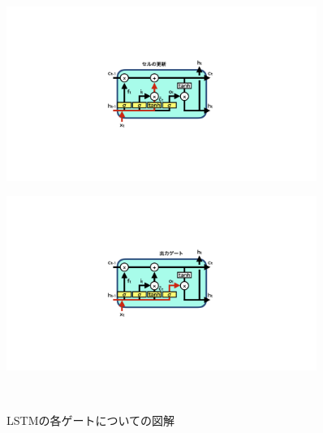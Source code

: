 \begin{figure}[htbp]
  \begin{minipage}{1.0\textwidth}
  \centering
   \begin{minipage}{0.48\textwidth}
   \centering
    \includegraphics[trim = 600 300 600 300, width=0.9\textwidth, clip]{Figure/2DeepLearning/14CellUpdate.png}
    \label{14CellUpdate}
   \end{minipage}
   \begin{minipage}{0.48\textwidth}
   \centering
    \includegraphics[trim = 600 300 600 300, width=0.9\textwidth, clip]{Figure/2DeepLearning/15OutputGate.png}
    \label{15OutputGate}
   \end{minipage}
   \end{minipage}
  \caption{LSTMの各ゲートについての図解}
\end{figure}

